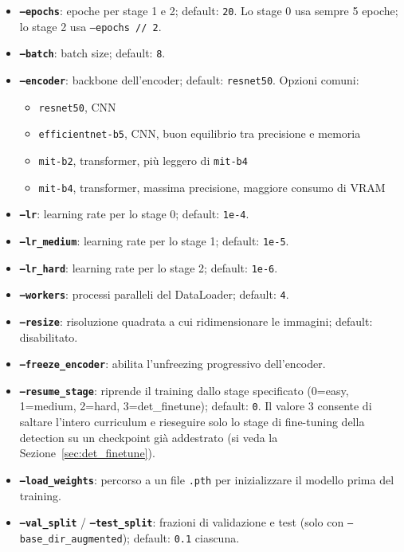 \begin{itemize}
    \item \textbf{\texttt{--epochs}}: epoche per stage 1 e 2; default: \texttt{20}. Lo stage 0 usa sempre 5 epoche; lo stage 2 usa \texttt{--epochs // 2}.
    \item \textbf{\texttt{--batch}}: batch size; default: \texttt{8}.
    \item \textbf{\texttt{--encoder}}: backbone dell'encoder; default: \texttt{resnet50}. Opzioni comuni:
        \begin{itemize}
            \item \texttt{resnet50}, CNN
            \item \texttt{efficientnet-b5}, CNN, buon equilibrio tra precisione e memoria
            \item \texttt{mit-b2}, transformer, più leggero di \texttt{mit-b4}
            \item \texttt{mit-b4}, transformer, massima precisione, maggiore consumo di VRAM
        \end{itemize}
    \item \textbf{\texttt{--lr}}: learning rate per lo stage 0; default: \texttt{1e-4}.
    \item \textbf{\texttt{--lr\_medium}}: learning rate per lo stage 1; default: \texttt{1e-5}.
    \item \textbf{\texttt{--lr\_hard}}: learning rate per lo stage 2; default: \texttt{1e-6}.
    \item \textbf{\texttt{--workers}}: processi paralleli del DataLoader; default: \texttt{4}.
    \item \textbf{\texttt{--resize}}: risoluzione quadrata a cui ridimensionare le immagini; default: disabilitato.
    \item \textbf{\texttt{--freeze\_encoder}}: abilita l'unfreezing progressivo dell'encoder.
    \item \textbf{\texttt{--resume\_stage}}: riprende il training dallo stage specificato (0=easy, 1=medium, 2=hard, 3=det\_finetune); default: \texttt{0}. Il valore 3 consente di saltare l'intero curriculum e rieseguire solo lo stage di fine-tuning della detection su un checkpoint già addestrato (si veda la Sezione~\ref{sec:det_finetune}).
    \item \textbf{\texttt{--load\_weights}}: percorso a un file \texttt{.pth} per inizializzare il modello prima del training.
    \item \textbf{\texttt{--val\_split}} / \textbf{\texttt{--test\_split}}: frazioni di validazione e test (solo con \texttt{--base\_dir\_augmented}); default: \texttt{0.1} ciascuna.

\end{itemize}
